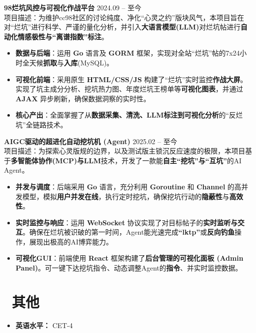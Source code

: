 \documentclass[11pt]{article}
\newlength{\interProjectSpacing}
\newcommand{\projectsep}{\vspace{\interProjectSpacing}}
\newlength{\intraProjectTitleSep}
\newcommand{\titlebreak}{\\[\intraProjectTitleSep]}
\newlength{\intraProjectListTopSep}
\begin{document}
\textbf{98烂坑风控与可视化作战平台} \hfill 2024.09 -- 至今 \titlebreak
项目描述：为维护cc98社区的讨论纯度、净化“心灵之约”版块风气，本项目旨在对“烂坑”进行科学、严谨的量化分析，并引入\textbf{大语言模型(LLM)}对烂坑帖进行\textbf{自动化情感极性与“离谱指数”标注}。
\begin{itemize}[nosep, topsep=\intraProjectListTopSep]
    \item \textbf{数据与后端}：运用 \textbf{Go} 语言及 \textbf{GORM} 框架，实现对全站“烂坑”帖的7x24小时全天候\textbf{抓取}与\textbf{入库}(MySQL)。
    \item \textbf{可视化前端}：采用原生 \textbf{HTML/CSS/JS} 构建了“烂坑”实时监控\textbf{作战大屏}。实现了坑主成分分析、挖坑热力图、年度烂坑王榜单等\textbf{可视化图表}，并通过 \textbf{AJAX} 异步刷新，确保数据洞察的实时性。
    \item \textbf{核心产出}：全面掌握了从\textbf{数据采集、清洗、LLM标注到可视化分析}的“反烂坑”全链路技术。
\end{itemize}

\projectsep

\textbf{AIGC驱动的超进化自动挖坑机 (Agent)} \hfill 2025.02 -- 至今 \titlebreak
项目描述：为探索心灵版规的边界，以及测试版主锁沉反应速度的极限，本项目基于\textbf{多智能体协作(MCP)与LLM}技术，开发了一款能\textbf{自主“挖坑”与“互坑”}的AI Agent。
\begin{itemize}[nosep, topsep=\intraProjectListTopSep]
    \item \textbf{并发与调度}：后端采用 \textbf{Go} 语言，充分利用 \textbf{Goroutine} 和 \textbf{Channel} 的高并发模型，模拟\textbf{用户并发在线}，执行定时挖坑，确保挖坑行动的\textbf{隐蔽性}与\textbf{高效性}。
    \item \textbf{实时监控与响应}：运用 \textbf{WebSocket} 协议实现了对目标帖子的\textbf{实时监听与交互}。确保在烂坑被识破的第一时间，Agent能光速完成\textbf{“lktp”}或\textbf{反向钓鱼}操作，展现出极高的AI博弈能力。
    \item \textbf{可视化GUI}：前端使用 \textbf{React} 框架构建了\textbf{后台管理的可视化面板 (Admin Panel)}。可一键下达挖坑指令、动态调整Agent的\textbf{指令}、并实时监控数据。
\end{itemize}
    
\section{\makebox[\widthof{\faInfo}][c]{\color{CVBlue}\faInfo}\ 其他}
\begin{itemize}[parsep=0.5ex]
    \item \textbf{英语水平：} CET-4
\end{itemize}
\end{document}
